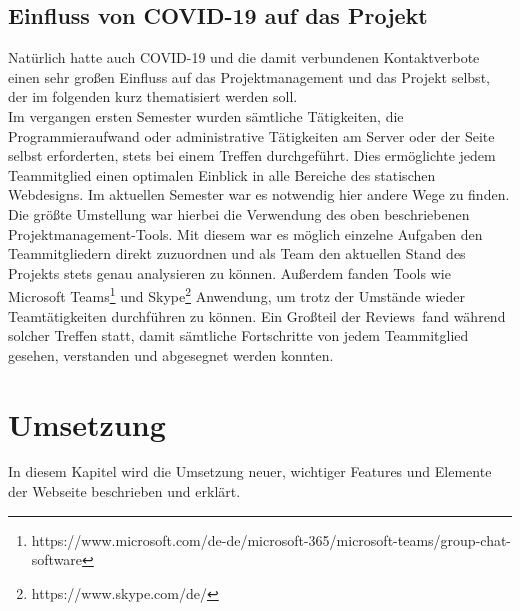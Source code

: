 \documentclass[12pt,a4paper]{article}
\begin{document}
\subsection{Einfluss von COVID-19 auf das Projekt}
Natürlich hatte auch COVID-19 und die damit verbundenen Kontaktverbote einen sehr großen Einfluss auf das Projektmanagement und das Projekt selbst, der im folgenden kurz thematisiert werden soll.\\
Im vergangen ersten Semester wurden sämtliche Tätigkeiten, die Programmieraufwand oder administrative Tätigkeiten am Server oder der Seite selbst erforderten, stets bei einem Treffen durchgeführt. Dies ermöglichte jedem Teammitglied einen optimalen Einblick in alle Bereiche des statischen Webdesigns. Im aktuellen Semester war es notwendig hier andere Wege zu finden.
Die größte Umstellung war hierbei die Verwendung des oben beschriebenen Projektmanagement-Tools. Mit diesem war es möglich einzelne Aufgaben den Teammitgliedern direkt zuzuordnen und als Team den aktuellen Stand des Projekts stets genau analysieren zu können. Außerdem fanden Tools wie Microsoft Teams\footnote{\label{foot:Teams} https://www.microsoft.com/de-de/microsoft-365/microsoft-teams/group-chat-software} und Skype\footnote{\label{foot:Skype} https://www.skype.com/de/} Anwendung, um trotz der Umstände wieder Teamtätigkeiten durchführen zu können. Ein Großteil der \glqq Reviews\grqq \ fand während solcher Treffen statt, damit sämtliche Fortschritte von jedem Teammitglied gesehen, verstanden und abgesegnet werden konnten.





\section{Umsetzung}\label{sec:Umsetzung}
In diesem Kapitel wird die Umsetzung neuer, wichtiger Features und Elemente der Webseite beschrieben und erklärt. 
\end{document}
